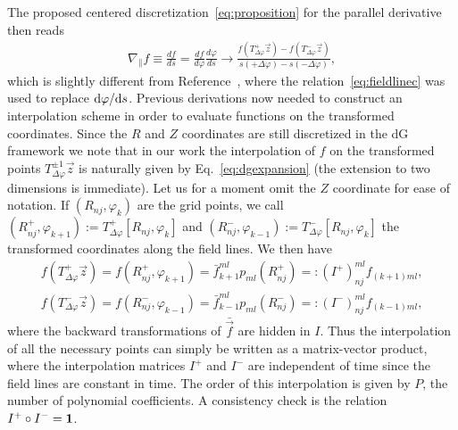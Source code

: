 The proposed centered discretization~\eqref{eq:proposition} for the parallel derivative then reads
\begin{align}
    \nabla_\parallel f \equiv \frac{df}{ds} = \frac{df}{d\varphi}\frac{d\varphi}{ds} 
    \rightarrow \frac{f\left(T_{\Delta\varphi}^+\vec z\right)-f\left(T_{\Delta\varphi}^-\vec z\right)}{s(+\Delta\varphi) - s(-\Delta\varphi)},
    \label{eq:paralleldis}
\end{align}
which is slightly different from Reference~\cite{Hariri2014}, where
the relation~\eqref{eq:fieldlinec} was used to replace $\mathrm{d} \varphi/\mathrm{d} s$. 
Previous derivations now needed to construct an interpolation scheme in order
to evaluate functions on the transformed coordinates. 
Since the $R$ and $Z$ coordinates are still discretized in the dG framework we note that in our work
the interpolation of $f$ on the transformed points $T_{\Delta\varphi}^{\pm 1}\vec z$
is naturally given by Eq.~\eqref{eq:dgexpansion} (the extension to two dimensions is immediate). 
Let us for a moment omit the $Z$ coordinate for ease of notation. If $(R_{nj}, \varphi_k)$ are the grid points, 
we call $(R^+_{nj}, \varphi_{k+1}) := T^+_{\Delta\varphi}[R_{nj}, \varphi_k]$ and $(R_{nj}^-, \varphi_{k-1}) := T^-_{\Delta\varphi}[R_{nj}, \varphi_k]$ the transformed coordinates along
the field lines. We then have
\begin{subequations}
\begin{align}
    f(T^+_{\Delta\varphi}\vec z) = f( R^+_{nj}, \varphi_{k+1}) = \bar f_{k+1}^{ml}p_{ml}(R^+_{nj}) =: (I^+)_{nj}^{ml}f_{(k+1)ml} , \\
    f(T^-_{\Delta\varphi}\vec z) = f( R^-_{nj}, \varphi_{k-1}) = \bar f_{k-1}^{ml}p_{ml}(R^-_{nj}) =: (I^-)_{nj}^{ml}f_{(k-1)ml} , 
\end{align}
\label{eq:interpolation}
\end{subequations}
where the backward transformations of $\bar{ \vec f}$ are hidden in $I$.
Thus the interpolation of all the necessary points can simply be written as a matrix-vector product, where the interpolation matrices $I^+$  and $I^-$ are independent of time since
the field lines are constant in time. The order of this interpolation is given by $P$, the number of polynomial coefficients.
A consistency check is the relation $I^+\circ I^- = \mathbf{1}$. 

